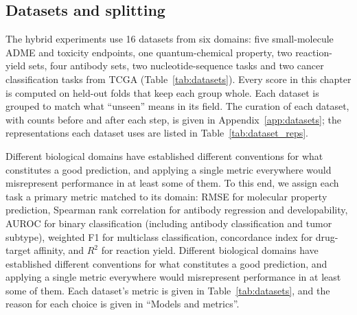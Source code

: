 \subsection{Datasets and splitting}

The hybrid experiments use 16 datasets from six domains: five small-molecule ADME and toxicity endpoints, one quantum-chemical property, two reaction-yield sets, four antibody sets, two nucleotide-sequence tasks and two cancer classification tasks from TCGA (Table~\ref{tab:datasets}). Every score in this chapter is computed on held-out folds that keep each group whole. Each dataset is grouped to match what ``unseen'' means in its field. The curation of each dataset, with counts before and after each step, is given in Appendix~\ref{app:datasets}; the representations each dataset uses are listed in Table~\ref{tab:dataset_reps}.

Different biological domains have established different conventions for what constitutes a good prediction, and applying a single metric everywhere would misrepresent performance in at least some of them. To this end, we assign each task a primary metric matched to its domain: RMSE for molecular property prediction, Spearman rank correlation for antibody regression and developability, AUROC for binary classification (including antibody classification and tumor subtype), weighted F1 for multiclass classification, concordance index for drug-target affinity, and $R^2$ for reaction yield.
Different biological domains have established different conventions for what constitutes a good prediction, and applying a single metric everywhere would misrepresent performance in at least some of them. Each dataset's metric is given in Table~\ref{tab:datasets}, and the reason for each choice is given in ``Models and metrics''.

